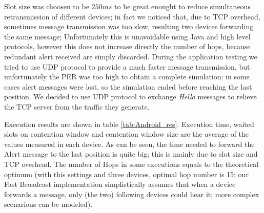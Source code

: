 Slot size was choosen to be $250ms$ to be great enought to reduce simultaneous retransmission of different devices; in fact we noticed that, due to TCP overhead, sometimes message transmission was too slow, resulting two devices forwarding the same message; Unfortunately this is unavoidable using Java and high level protocols, however this does not increase directly the number of hops, because redundant alert received are simply discarded.
During the application testing we tried to use UDP protocol to provide a much faster message transmission, but unfortunately the PER was too high to obtain a complete simulation: in some cases alert messages were lost, so the simulation ended before reaching the last position. We decided to use UDP protocol to exchange \textit{Hello} messages to relieve the TCP server from the traffic they generate.

Execution results are shown in table \ref{tab:Android_res}. Execution time, waited slots on contention window and contention window size are the average of the values measured in each device. As can be seen, the time needed to forward the Alert message to the last position is quite big; this is mainly due to slot size and TCP overhead. The number of Hops in some executions equals to the theoretical optimum (with this settings and three devices, optimal hop number is 15: our Fast Broadcast implementation simplistically assumes that when a device forwards a message, only (the two) following devices could hear it; more complex scenarious can be modeled).

